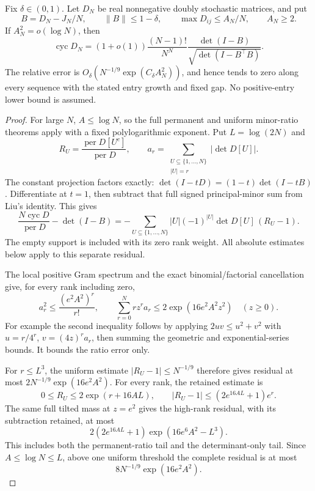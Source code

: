 \begin{theorem}
\label{thm:relativeaperiodic}
Fix \(\delta\in(0,1)\). Let \(D_N\) be real nonnegative
doubly stochastic matrices, and put
\[
 B=D_N-J_N/N,\qquad \|B\|\leq1-\delta,\qquad
 \max D_{ij}\leq A_N/N,\qquad A_N\geq2.
\]
If \(A_N^2=o(\log N)\), then
\[
 \operatorname{cyc}D_N
 =(1+o(1))\frac{(N-1)!}{N^N}
       \frac{\det(I-B)}{\sqrt{\det(I-B^\top B)}}.
\]
The relative error is
\(O_\delta(N^{-1/9}\exp(C_\delta A_N^2))\), and hence
tends to zero along every sequence with the stated entry
growth and fixed gap. No positive-entry lower bound is assumed.
\end{theorem}
\begin{proof}
For large \(N\), \(A\leq\log N\), so the full permanent and uniform
minor-ratio theorems apply with a fixed polylogarithmic exponent.
Put \(L=\log(2N)\) and
\[
 R_U=\frac{\operatorname{per}D[U^c]}{\operatorname{per}D},
 \qquad a_r=\sum_{\substack{U\subseteq\{1,\ldots,N\}\\|U|=r}}
                                      |\det D[U]|.
\]
The constant projection factors exactly:
\(\det(I-tD)=(1-t)\det(I-tB)\).
Differentiate at \(t=1\), then subtract that full signed
principal-minor sum from Liu's identity. This gives
\[
 \frac{N\operatorname{cyc}D}{\operatorname{per}D}-\det(I-B)
 =-\sum_{U\subseteq\{1,\ldots,N\}}
       |U|(-1)^{|U|}\det D[U]\,(R_U-1).
\]
The empty support is included with its zero rank weight.
All absolute estimates below apply to this separate residual.

The local positive Gram spectrum and the exact binomial/factorial
cancellation give, for every rank including zero,
\[
 a_r^2\leq\frac{(e^2A^2)^r}{r!},\qquad
 \sum_{r=0}^{N}r z^r a_r\leq2\exp(16e^2A^2z^2)
                                               \quad(z\geq0).
\]
For example the second inequality follows by applying
\(2uv\leq u^2+v^2\) with
\(u=r/4^r\), \(v=(4z)^ra_r\), then summing the geometric
and exponential-series bounds. It bounds the ratio error only.

For \(r\leq L^3\), the uniform estimate
\(|R_U-1|\leq N^{-1/9}\) therefore gives residual at most
\(2N^{-1/9}\exp(16e^2A^2)\).
For every rank, the retained estimate is
\[
 0\leq R_U\leq2\exp(r+16AL),\qquad
 |R_U-1|\leq(2e^{16AL}+1)e^r .
\]
The same full tilted mass at \(z=e^2\) gives the high-rank
residual, with its subtraction retained, at most
\[
 2(2e^{16AL}+1)\exp(16e^6A^2-L^3).
\]
This includes both the permanent-ratio tail and the
determinant-only tail. Since \(A\leq\log N\leq L\),
above one uniform threshold the complete residual is at most
\[
 8N^{-1/9}\exp(16e^2A^2).
\]


\end{proof}
